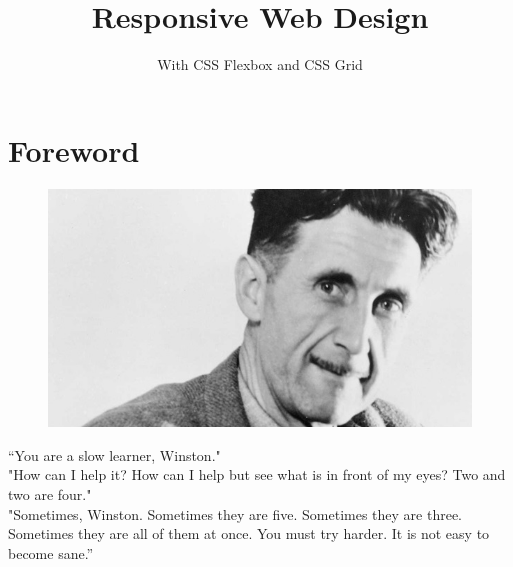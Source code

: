 \documentclass{42-en}
\begin{document}
                           \title{Responsive Web Design}
                          \subtitle{With CSS Flexbox and CSS Grid}


\maketitle

\tableofcontents


\chapter{Foreword}

    \begin{figure}[H]
        \begin{center}
            \includegraphics[width=12cm]{george-orwell.jpg}
        \end{center}
    \end{figure}
“You are a slow learner, Winston."\\
"How can I help it? How can I help but see what is in front of my eyes? Two and two are four."\\
"Sometimes, Winston. Sometimes they are five. Sometimes they are three. Sometimes they are all of them at once. You must try harder. It is not easy to become sane.”\\
\end{document}
